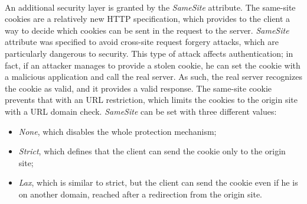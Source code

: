 \\ An additional security layer is granted by the \textit{SameSite} attribute. The same-site cookies are a relatively new HTTP specification, which provides to the client a way to decide which cookies can be sent in the request to the server.  \textit{SameSite} attribute was specified to avoid cross-site request forgery attacks, which are particularly dangerous to security\cite{ietf-httpbis-rfc6265bis-11}. This type of attack affects authentication; in fact, if an attacker manages to provide a stolen cookie, he can set the cookie with a malicious application and call the real server. As such, the real server recognizes the cookie as valid, and it provides a valid response. The same-site cookie prevents that with an URL restriction, which limits the cookies to the origin site with a URL domain check. \textit{SameSite} can be set with three different values:
\begin{itemize}
    \item \textit{None}, which disables the whole protection mechanism;
    \item \textit{Strict}, which defines that the client can send the cookie only to the origin site;
    \item \textit{Lax}, which is similar to strict, but the client can send the cookie even if he is on another domain, reached after a redirection from the origin site. 
\end{itemize}

